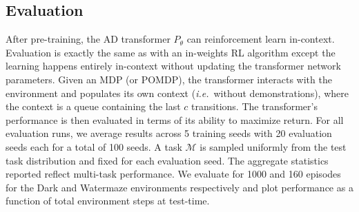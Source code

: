 \documentclass{article}
\theoremstyle{thm}
\newcommand{\algo}{\ensuremath{P}}
\newcommand{\name}{AD }
\newcommand{\ie}{{\it i.e.}}
\begin{document}
\subsection{Evaluation}
After pre-training, the \name transformer $\algo_\theta$ can reinforcement learn in-context. Evaluation is exactly the same as with an in-weights RL algorithm except the learning happens entirely in-context without updating the transformer network parameters. Given an MDP (or POMDP), the transformer interacts with the environment and populates its own context (\ie \ without demonstrations), where the context is a queue containing the last $c$ transitions. The transformer's performance is then evaluated in terms of its ability to maximize return. For all evaluation runs, we average results across 5 training seeds with 20 evaluation seeds each for a total of 100 seeds. A task $\mathcal M$ is sampled uniformly from the test task distribution and fixed for each evaluation seed. The aggregate statistics reported reflect multi-task performance. We evaluate for 1000 and 160 episodes for the Dark and Watermaze environments respectively and plot performance as a function of total environment steps at test-time.
\end{document}

